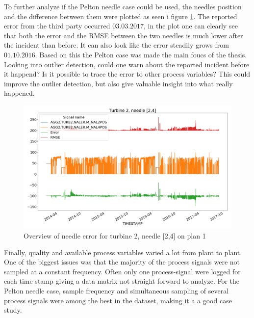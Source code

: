     To further analyze if the Pelton needle case could be used, the needles position and the difference between them were plotted as seen i figure \ref{fig:plant1_needle_error}. The reported error from the third party occurred $03.03.2017$, in the plot one can clearly see that both the error and the RMSE between the two needles is much lower after the incident than before. It can also look like the error steadily grows from $01.10.2016$. Based on this the Pelton case was made the main foucs of the thesis. Looking into outlier detection, could one warn about the reported incident before it happend? Is it possible to trace the error to other process variables? This could improve the outlier detection, but also give valuable insight into what really happened. 
    
    \begin{figure}
        \centering
        \includegraphics[width=\textwidth]{report/figures/data/turbine2_needle2_4.png}
        \caption{Overview of needle error for turbine 2, needle [2,4] on plan 1}
        \label{fig:plant1_needle_error}
    \end{figure}
    
    Finally, quality and available process variables varied a lot from plant to plant. One of the biggest issues was that the majority of the process signals were not sampled at a constant frequency. Often only one process-signal were logged for each time stamp giving a data matrix not straight forward to analyze. For the Pelton needle case, sample frequency and simultaneous sampling of several process signals were among the best in the dataset, making it a a good case study. 
    
    

